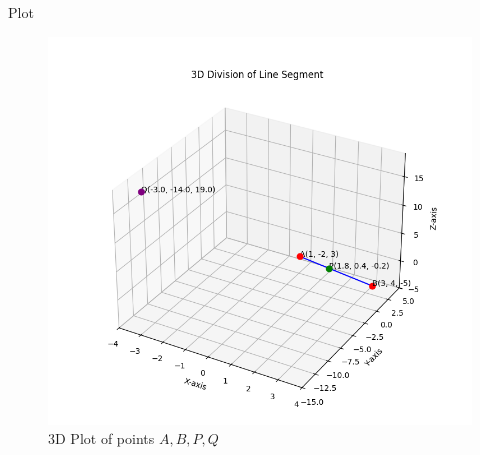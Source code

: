 \documentclass{beamer}
\begin{document}
\begin{frame}{Plot}
\begin{figure}
\centering
\includegraphics[width=0.6\linewidth]{figs/fig1.png}
\caption{3D Plot of points \(A, B, P, Q\)}
\label{fig:graph}
\end{figure}
\end{frame}
\end{document}
